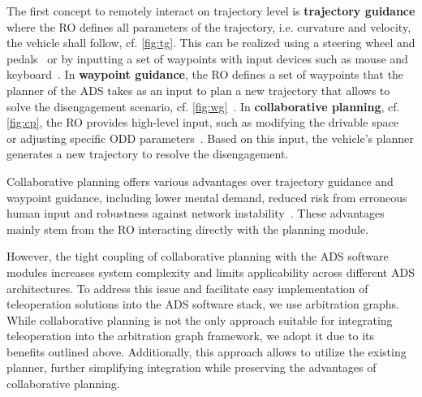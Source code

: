 The first concept to remotely interact on trajectory level is \textbf{trajectory guidance} where the \gls{RO} defines all parameters of the trajectory, i.e. curvature and velocity, the vehicle shall follow, cf. \cref{fig:tg}.
This can be realized using a steering wheel and pedals~\cite{Gna2012TrajectoryBasedSharedAutonomy, Hof2022bSafeCorridor} or by inputting a set of waypoints with input devices such as mouse and keyboard~\cite{Wolf2024TrajectoryGuidance, Majstorovic2024trajectoryGuidance}. 
In \textbf{waypoint guidance}, the \gls{RO} defines a set of waypoints that the planner of the \gls{ADS} takes as an input to plan a new trajectory that allows to solve the disengagement scenario, cf. \cref{fig:wg}~\cite{5gcroco2021, Gontscharow2024WaypointGuidance}.
In \textbf{collaborative planning}, cf. \cref{fig:cp}, the \gls{RO} provides high-level input, such as modifying the drivable space~\cite{Schitz2021InteractivePathPlanning} or adjusting specific ODD parameters~\cite{Maj2023CollaborativePathPlanning}. Based on this input, the vehicle's planner generates a new trajectory to resolve the disengagement.

Collaborative planning offers various advantages over trajectory guidance and waypoint guidance, including lower mental demand, reduced risk from erroneous human input and robustness against network instability~\cite{Brecht2024EvaluationOfConcepts}.
These advantages mainly stem from the \gls{RO} interacting directly with the planning module. 
%

%
%
%

%
%
%
%

However, the tight coupling of collaborative planning with the \gls{ADS} software modules increases system complexity and limits applicability across different \gls{ADS} architectures. 
To address this issue and facilitate easy implementation of teleoperation solutions into the \gls{ADS} software stack, we use arbitration graphs.
While collaborative planning is not the only approach suitable for integrating teleoperation into the arbitration graph framework, we adopt it due to its benefits outlined above. 
Additionally, this approach allows to utilize the existing planner, further simplifying integration while preserving the advantages of collaborative planning.
%
%